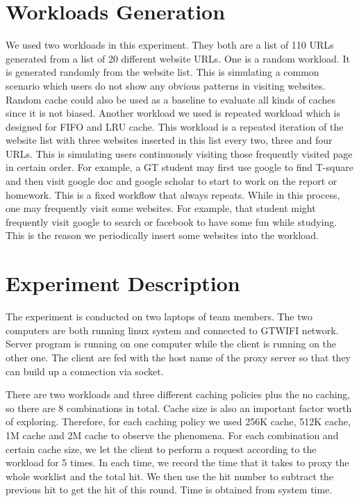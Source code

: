 \documentclass[paper=a4, fontsize=11pt]{scrartcl} %
\numberwithin{equation}{section} %
\numberwithin{figure}{section} %
\numberwithin{table}{section} %
\begin{document}
\section{Workloads Generation}

We used two workloads in this experiment. They both are a list of 110 URLs generated from a list of 20 different website URLs. One is a random workload. It is generated randomly from the website list. This is simulating a common scenario which users do not show any obvious patterns in visiting websites. Random cache could also be used as a baseline to evaluate all kinds of caches since it is not biased. Another workload we used is repeated workload which is designed for FIFO and LRU cache. This workload is a repeated iteration of the website list with three websites inserted in this list every two, three and four URLs. This is simulating users continuously visiting those frequently visited page in certain order. For example, a GT student may first use google to find T-square and then visit google doc and google scholar to start to work on the report or homework. This is a fixed workflow that always repeats. While in this process, one may frequently visit some websites. For example, that student might frequently visit google to search or facebook to have some fun while studying. This is the reason we periodically insert some websites into the workload.  
    

\section{Experiment Description}

The experiment is conducted on two laptops of team members. The two computers are both running linux system and connected to GTWIFI network. Server program is running on one computer while the client is running on the other one. The client are fed with the host name of the proxy server so that they can build up a connection via socket. 

There are two workloads and three different caching policies plus the no caching, so there are 8 combinations in total. Cache size is also an important factor worth of exploring. Therefore, for each caching policy we used 256K cache, 512K cache, 1M cache and 2M cache to observe the phenomena. For each combination and certain cache size, we let the client to perform a request according to the workload for 5 times. In each time, we record the time that it takes to proxy the whole worklist and the total hit. We then use the hit number to subtract the previous hit to get the hit of this round. Time is obtained from system time. 
\end{document}
